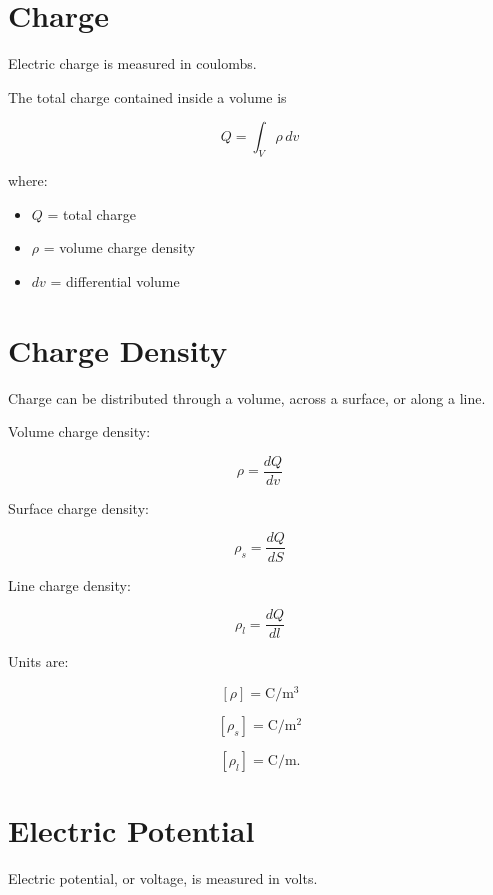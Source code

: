 \documentclass[11pt]{article}
\begin{document}
\section{Charge}

Electric charge is measured in coulombs.

The total charge contained inside a volume is

\[
\boxed{
Q
=
\int_V\rho\,dv
}
\]

where:

\begin{itemize}
    \item $Q$ = total charge
    \item $\rho$ = volume charge density
    \item $dv$ = differential volume
\end{itemize}



\section{Charge Density}

Charge can be distributed through a volume, across a surface, or along a line.

Volume charge density:

\[
\boxed{
\rho
=
\frac{dQ}{dv}
}
\]

Surface charge density:

\[
\boxed{
\rho_s
=
\frac{dQ}{dS}
}
\]

Line charge density:

\[
\boxed{
\rho_l
=
\frac{dQ}{dl}
}
\]

Units are:

\[
[\rho]=\mathrm{C/m^3}
\]

\[
[\rho_s]=\mathrm{C/m^2}
\]

\[
[\rho_l]=\mathrm{C/m}.
\]



\section{Electric Potential}

Electric potential, or voltage, is measured in volts.
\end{document}
